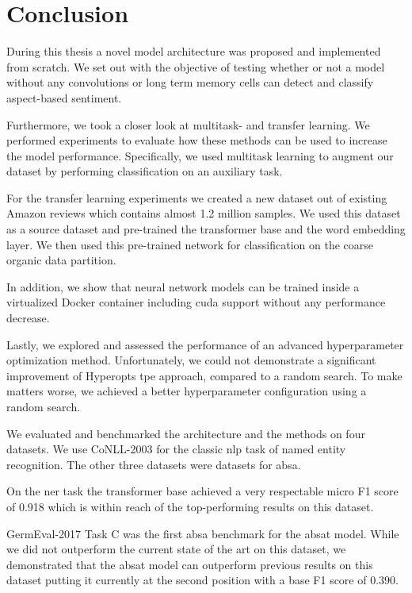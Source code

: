 \chapter{Conclusion}
\label{ch:conclusion}
During this thesis a novel model architecture was proposed and implemented from scratch. We set out with the objective of testing whether or not a model without any convolutions or long term memory cells can detect and classify aspect-based sentiment.
\medskip

Furthermore, we took a closer look at multitask- and transfer learning. We performed experiments to evaluate how these methods can be used to increase the model performance. Specifically, we used multitask learning to augment our dataset by performing classification on an auxiliary task. 
\smallskip

For the transfer learning experiments we created a new dataset out of existing Amazon reviews which contains almost 1.2 million samples. We used this dataset as a source dataset and pre-trained the transformer base and the word embedding layer. We then used this pre-trained network for classification on the coarse organic data partition.
\medskip

In addition, we show that neural network models can be trained inside a virtualized Docker container including \gls{cuda} support without any performance decrease. 
\medskip

Lastly, we explored and assessed the performance of an advanced hyperparameter optimization method. Unfortunately, we could not demonstrate a significant improvement of Hyperopts \gls{tpe} approach, compared to a random search. To make matters worse, we achieved a better hyperparameter configuration using a random search.
\bigskip

We evaluated and benchmarked the architecture and the methods on four datasets. We use CoNLL-2003 for the classic \gls{nlp} task of named entity recognition. The other three datasets were datasets for \gls{absa}.
\medskip

On the \gls{ner} task the transformer base achieved a very respectable micro F1 score of 0.918 which is within reach of the top-performing results on this dataset. 

GermEval-2017 Task C was the first \gls{absa} benchmark for the \gls{absat} model. While we did not outperform the current state of the art on this dataset, we demonstrated that the \gls{absat} model can outperform previous results on this dataset putting it currently at the second position with a base F1 score of 0.390. 
\medskip

